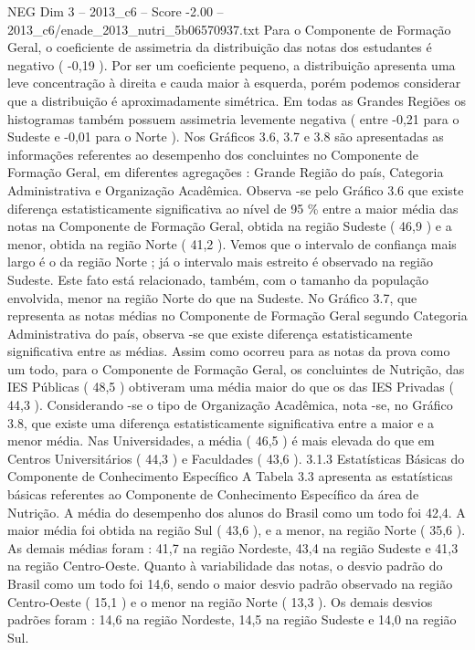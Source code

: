 \begin{textsample}{NEG Dim 3 – 2013\_c6 – Score -2.00 – 2013\_c6/enade\_2013\_nutri\_5b06570937.txt}
Para o Componente de Formação Geral, o coeficiente de assimetria da distribuição das notas dos estudantes é negativo ( -0,19 ).
Por ser um coeficiente pequeno, a distribuição apresenta uma leve concentração à direita e cauda maior à esquerda, porém podemos considerar que a distribuição é aproximadamente simétrica.
Em todas as Grandes Regiões os histogramas também possuem assimetria levemente negativa ( entre -0,21 para o Sudeste e -0,01 para o Norte ).
Nos Gráficos 3.6, 3.7 e 3.8 são apresentadas as informações referentes ao desempenho dos concluintes no Componente de Formação Geral, em diferentes agregações : Grande Região do país, Categoria Administrativa e Organização Acadêmica.
Observa -se pelo Gráfico 3.6 que existe diferença estatisticamente significativa ao nível de 95 \% entre a maior média das notas na Componente de Formação Geral, obtida na região Sudeste ( 46,9 ) e a menor, obtida na região Norte ( 41,2 ).
Vemos que o intervalo de confiança mais largo é o da região Norte ; já o intervalo mais estreito é observado na região Sudeste.
Este fato está relacionado, também, com o tamanho da população envolvida, menor na região Norte do que na Sudeste.
No Gráfico 3.7, que representa as notas médias no Componente de Formação Geral segundo Categoria Administrativa do país, observa -se que existe diferença estatisticamente significativa entre as médias.
Assim como ocorreu para as notas da prova como um todo, para o Componente de Formação Geral, os concluintes de Nutrição, das IES Públicas ( 48,5 ) obtiveram uma média maior do que os das IES Privadas ( 44,3 ).
Considerando -se o tipo de Organização Acadêmica, nota -se, no Gráfico 3.8, que existe uma diferença estatisticamente significativa entre a maior e a menor média.
Nas Universidades, a média ( 46,5 ) é mais elevada do que em Centros Universitários ( 44,3 ) e Faculdades ( 43,6 ). 3.1.3 Estatísticas Básicas do Componente de Conhecimento Específico A Tabela 3.3 apresenta as estatísticas básicas referentes ao Componente de Conhecimento Específico da área de Nutrição.
A média do desempenho dos alunos do Brasil como um todo foi 42,4.
A maior média foi obtida na região Sul ( 43,6 ), e a menor, na região Norte ( 35,6 ).
As demais médias foram : 41,7 na região Nordeste, 43,4 na região Sudeste e 41,3 na região Centro-Oeste.
Quanto à variabilidade das notas, o desvio padrão do Brasil como um todo foi 14,6, sendo o maior desvio padrão observado na região Centro-Oeste ( 15,1 ) e o menor na região Norte ( 13,3 ).
Os demais desvios padrões foram : 14,6 na região Nordeste, 14,5 na região Sudeste e 14,0 na região Sul.

\end{textsample}
